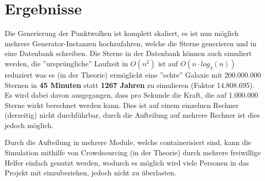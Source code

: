 \section{Ergebnisse}
Die Generierung der Punktwolken ist komplett skaliert, es ist nun möglich
mehrere Generator-Instanzen hochzufahren, welche die Sterne generieren und in
eine Datenbank schreiben. Die Sterne in der Datenbank können auch simuliert
werden, die ''ursprüngliche'' Laufzeit in \( O(n^2) \) ist auf \( O(n \cdot
log_4(n)) \) reduziert was es (in der Theorie) ermöglicht eine ''echte''
Galaxie mit 200.000.000 Sternen in \textbf{45 Minuten} statt \textbf{1267
Jahren} zu simulieren (Faktor 14.808.695). Es wird dabei davon ausgegangen,
dass pro Sekunde die Kraft, die auf 1.000.000 Sterne wirkt berechnet werden
kann. Dies ist auf einem einzelnen Rechner (derzeitig) nicht durchführbar, durch
die Aufteilung auf mehrere Rechner ist dies jedoch möglich.

\par Durch die Aufteilung in mehrere Module, welche containerisiert sind, kann
die Simulation mithilfe von Crowdsourcing (in der Theorie) durch mehrere
freiwillige Helfer einfach genutzt werden, wodurch es möglich wird viele
Personen in das Projekt mit einzubeziehen, jedoch nicht zu überlasten.


